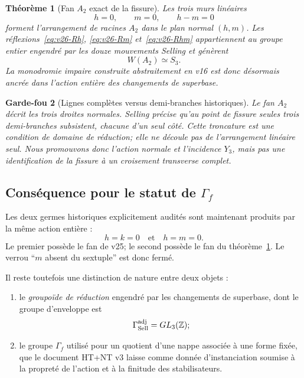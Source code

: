 \documentclass[11pt,a4paper]{article}
\newtheorem{theorem}{Théorème}[section]
\newtheorem{guardrail}[theorem]{Garde-fou}
\begin{document}
\begin{theorem}[Fan $A_2$ exact de la fissure]\label{thm:v26-fissure-A2}
Les trois murs linéaires
\[
 h=0,\qquad m=0,\qquad h-m=0
\]
forment l'arrangement de racines $A_2$ dans le plan normal $(h,m)$. Les réflexions~\eqref{eq:v26-Rh}, \eqref{eq:v26-Rm} et~\eqref{eq:v26-Rhm} appartiennent au groupe entier engendré par les douze mouvements Selling et génèrent
\[
 \boxed{W(A_2)\simeq S_3.}
\]
La monodromie impaire construite abstraitement en v16 est donc désormais ancrée dans l'action entière des changements de superbase.
\end{theorem}

\begin{guardrail}[Lignes complètes versus demi-branches historiques]
Le fan $A_2$ décrit les trois \emph{droites} normales. Selling précise qu'au point de fissure seules trois demi-branches subsistent, chacune d'un seul côté. Cette troncature est une condition de domaine de réduction; elle ne découle pas de l'arrangement linéaire seul. Nous promouvons donc l'action normale et l'incidence $Y_3$, mais pas une identification de la fissure à un croisement transverse complet.
\end{guardrail}

\subsection{Conséquence pour le statut de \texorpdfstring{$\Gamma_f$}{Gammaf}}

Les deux germes historiques explicitement audités sont maintenant produits par la même action entière :
\[
 h=k=0
 \quad\text{et}\quad
 h=m=0.
\]
Le premier possède le fan de v25; le second possède le fan du théorème~\ref{thm:v26-fissure-A2}. Le verrou ``$m$ absent du sextuple'' est donc fermé.

Il reste toutefois une distinction de nature entre deux objets :
\begin{enumerate}[label=\textup{(\roman*)}]
\item le \emph{groupoïde de réduction} engendré par les changements de superbase, dont le groupe d'enveloppe est
\[
 \Gamma_{\rm Sell}^{\rm adj}=GL_3(\mathbb Z);
\]
\item le groupe $\Gamma_f$ utilisé pour un quotient d'une nappe associée à une forme fixée, que le document HT+NT v3 laisse comme donnée d'instanciation soumise à la propreté de l'action et à la finitude des stabilisateurs.
\end{enumerate}
\end{document}

